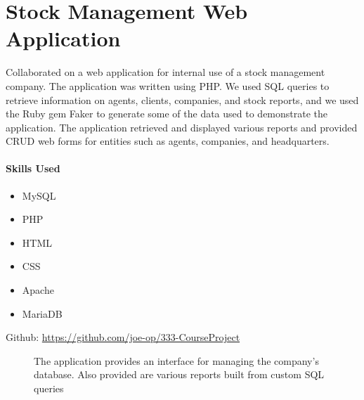 \documentclass[12pt]{article}
\makeatletter
\newcommand\nocaption[1]{\newline\footnotesize\sffamily #1}
\newcommand\sectionsubtitle[1]{\def\@sectionsubtitle{#1}}
\makeatother
\begin{document}
\clearpage

\sectionsubtitle{Database Management Systems, University of Wisconsin-River Falls}
\section*{Stock Management Web Application}
\thispagestyle{plain}
    
Collaborated on a web application for internal use of a stock management company.  The application was written using PHP.  We used SQL queries to retrieve information on agents, clients, companies, and stock reports, and we used the Ruby gem Faker to generate some of the data used to demonstrate the application.  The application retrieved and displayed various reports and provided CRUD web forms for entities such as agents, companies, and headquarters. 

\paragraph{Skills Used}
\begin{itemize}
\item MySQL
\item PHP
\item HTML
\item CSS
\item Apache
\item MariaDB
\end{itemize}


\vspace{\baselineskip}
Github: \url{https://github.com/joe-op/333-CourseProject}

\begin{figure}[ht]
\centering
    \nocaption{The application provides an interface for managing the company's database.  Also provided are various reports built from custom SQL queries}
    \label{fig:exam-1}
\end{figure}
\end{document}
